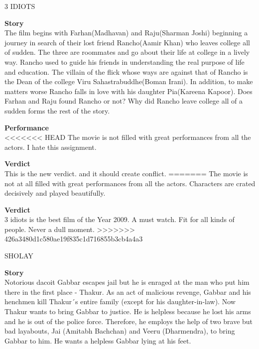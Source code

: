 \begin{center}
\textmd {\huge 3 IDIOTS}
\end{center}

\begin{flushleft}
\textbf{Story}\\
The film begins with Farhan(Madhavan) and Raju(Sharman Joshi) beginning a journey in search of their lost friend Rancho(Aamir Khan) who leaves college all of sudden. The three are roommates and go about their life at college in a lively way. Rancho used to guide his friends in understanding the real purpose of life and education. The villain of the flick whose ways are against that of Rancho is the Dean of the college Viru Sahastrabuddhe(Boman Irani). In addition, to make matters worse Rancho falls in love with his daughter Pia(Kareena Kapoor). Does Farhan and Raju found Rancho or not? Why did Rancho leave college all of a sudden forms the rest of the story.\\
\vspace{3mm}

\textbf{Performance}\\
<<<<<<< HEAD
The movie is not filled with great performances from all the actors.
I hate this assignment.
\vspace{3mm}

\textbf{Verdict}\\
This is the new verdict.
and it should create conflict.
=======
The movie is not at all filled with great performances from all the actors. Characters are crated decisively and played beautifully.
\vspace{3mm}

\textbf{Verdict}\\
3 idiots is the best film of the Year 2009. A must watch. Fit for all kinds of people. Never a dull moment.
>>>>>>> 426a3480d1c580ae19f835c1d716855b3cb4a4a3
\vspace{3mm}

\begin{center}
\textmd {\huge SHOLAY}
\end{center}
\textbf{Story}\\
Notorious dacoit Gabbar escapes jail but he is enraged at the man who put him there in the first place - Thakur. As an act of malicious revenge, Gabbar and his henchmen kill Thakur´s entire family (except for his daughter-in-law). Now Thakur wants to bring Gabbar to justice. He is helpless because he lost his arms and he is out of the police force. Therefore, he employs the help of two brave but bad layabouts, Jai (Amitabh Bachchan) and Veeru (Dharmendra), to bring Gabbar to him. He wants a helpless Gabbar lying at his feet.\\
\vspace{3mm}


\end{flushleft}
